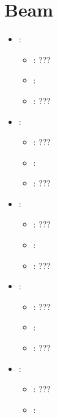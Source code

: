 \section{Beam}


\begin{itemize}
    \item {}:
           \begin{itemize}
                \item \optionPossibleValues{}: ???
                \item \optionDefaultValue{}: 
                \item \optionDescrption{}: ???
           \end{itemize}
    \item {}:
           \begin{itemize}
                \item \optionPossibleValues{}: ???
                \item \optionDefaultValue{}: 
                \item \optionDescrption{}: ???
           \end{itemize}
    \item {}:
           \begin{itemize}
                \item \optionPossibleValues{}: ???
                \item \optionDefaultValue{}: 
                \item \optionDescrption{}: ???
           \end{itemize}
    \item {}:
           \begin{itemize}
                \item \optionPossibleValues{}: ???
                \item \optionDefaultValue{}: 
                \item \optionDescrption{}: ???
           \end{itemize}
    \item {}:
           \begin{itemize}
                \item \optionPossibleValues{}: ???
                \item \optionDefaultValue{}: 

\end{itemize}
\end{itemize}
